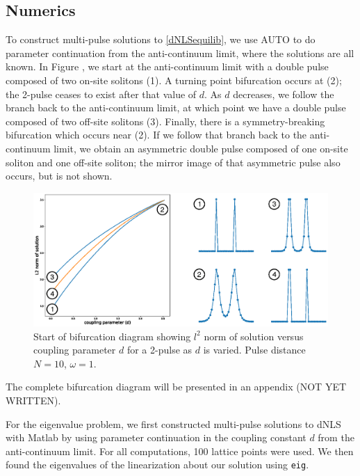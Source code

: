 \documentclass[12pt]{article}
\begin{document}
\subsection{Numerics}

To construct multi-pulse solutions to \eqref{dNLSequilib}, we use AUTO to do parameter continuation from the anti-continuum limit, where the solutions are all known. In Figure \label{fig:bd1}, we start at the anti-continuum limit with a double pulse composed of two on-site solitons (1). A turning point bifurcation occurs at (2); the 2-pulse ceases to exist after that value of $d$. As $d$ decreases, we follow the branch back to the anti-continuum limit, at which point we have a double pulse composed of two off-site solitons (3). Finally, there is a symmetry-breaking bifurcation which occurs near (2). If we follow that branch back to the anti-continuum limit, we obtain an asymmetric double pulse composed of one on-site soliton and one off-site soliton; the mirror image of that asymmetric pulse also occurs, but is not shown.
\begin{figure}[H]
\centering
\includegraphics[width=15cm]{bd1.eps}
\caption{Start of bifurcation diagram showing $l^2$ norm of solution versus coupling parameter $d$ for a 2-pulse as $d$ is varied. Pulse distance $N = 10$, $\omega = 1$.}
\label{fig:bd1}
\end{figure}
The complete bifurcation diagram will be presented in an appendix (NOT YET WRITTEN).

For the eigenvalue problem, we first constructed multi-pulse solutions to dNLS with Matlab by using parameter continuation in the coupling constant $d$ from the anti-continuum limit. For all computations, 100 lattice points were used. We then found the eigenvalues of the linearization about our solution using \texttt{eig}. 
\end{document}
